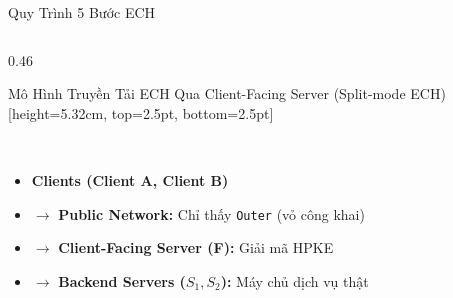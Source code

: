 \documentclass[aspectratio=169, 10pt]{beamer}
\begin{document}
\begin{frame}{Quy Trình 5 Bước ECH}
\begin{columns}[T]
\begin{column}{0.46\textwidth}
\begin{accentcard}[uetblue]{Mô Hình Truyền Tải ECH Qua Client-Facing Server (Split-mode ECH)}[height=5.32cm, top=2.5pt, bottom=2.5pt]
\\[6pt]
				\raggedright
				\setlength{\leftmargini}{9pt}
				\begin{itemize}\setlength{\itemsep}{4pt}\setlength{\topsep}{0pt}\fontsize{6.0pt}{7.6pt}\selectfont
					\item \textbf{Clients (Client A, Client B)}
					\item $\longrightarrow$ \textbf{Public Network:} Chỉ thấy \texttt{Outer} (vỏ công khai)
					\item $\longrightarrow$ \textbf{Client-Facing Server (F):} Giải mã HPKE
					\item $\longrightarrow$ \textbf{Backend Servers ($S_1, S_2$):} Máy chủ dịch vụ thật
				\end{itemize}
			\end{accentcard}
		\end{column}


\end{columns}
\end{frame}
\end{document}
